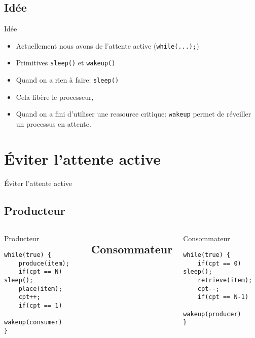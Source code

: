 \section{\sectitle}
\begin{frame}{\sectitle}
\def\subsectitle{Idée}
\subsection{\subsectitle}
\begin{block}{\subsectitle}
\begin{itemize}
    \item Actuellement nous avons de l'attente active (\texttt{while(...);})
    \item Primitives \texttt{sleep()} et \texttt{wakeup()}
    \item Quand on a rien à faire: \texttt{sleep()}
    \item Cela libère le processeur,
    \item Quand on a fini d'utiliser une ressource critique: \texttt{wakeup} 
    permet de réveiller un processus en attente.
\end{itemize}
\end{block}
\end{frame}

\def\sectitle{Éviter l'attente active}
\section{\sectitle}
\begin{frame}[containsverbatim]{\sectitle}
\def\subsectitle{Producteur}
\subsection{\subsectitle}
\begin{columns}[t]
\begin{exampleblock}{\subsectitle}
\begin{verbatim}
while(true) {
    produce(item);
    if(cpt == N) sleep();
    place(item);
    cpt++;
    if(cpt == 1) 
        wakeup(consumer)
}
\end{verbatim}
\end{exampleblock}
\def\subsectitle{Consommateur}
\subsection{\subsectitle}
\begin{exampleblock}{\subsectitle}
\begin{verbatim}
while(true) {
    if(cpt == 0) sleep();
    retrieve(item);
    cpt--;
    if(cpt == N-1) 
        wakeup(producer)
}
\end{verbatim}
\end{exampleblock}
\end{columns}

\end{frame}

